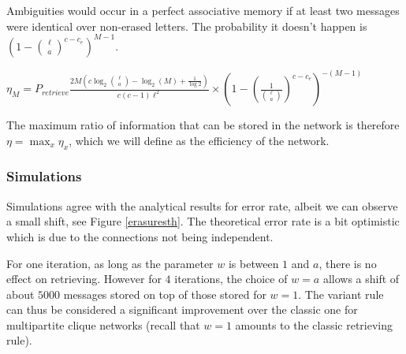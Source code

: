 \documentclass[english,10pt,twocolumn]{IEEEtran}
\theoremstyle{definition}
\begin{document}
	Ambiguities would occur in a perfect associative memory if at least two messages were identical over non-erased letters. The probability it doesn't happen is $ (1-{\ell \choose a}^{c - c_e})^{M-1}$.
	
	
	$\eta_M = P_{retrieve}  \frac{2 M\left(c \log_2{\ell \choose a } - \log_2(M) + \frac{1}{\log 2} \right)}{c(c-1)\ell^2} \times (1-(\frac{1}{{\ell \choose a}})^{c - c_e})^{-(M-1)}$
	
	The maximum ratio of information that can be stored in the network is therefore $\eta = \max_x \eta_x $, which we will define as the efficiency of the network.
	
	\subsubsection{Simulations}
		
		
		Simulations agree with the analytical results for error rate, albeit we can observe a small shift, see Figure \ref{erasuresth}. The theoretical error rate is a bit optimistic which is due to the connections not being independent.
		
		 For one iteration, as long as the parameter $w$ is between $1$ and $a$, there is no effect on retrieving. However for $4$ iterations, the choice of $w = a$ allows a shift of about $5000$ messages stored on top of those stored for $w = 1$. The variant rule can thus be considered a significant improvement over the classic one for multipartite clique networks (recall that $w = 1$ amounts to the classic retrieving rule).
		
		
	

	
	
	
		
	
	
	
		
\end{document}
